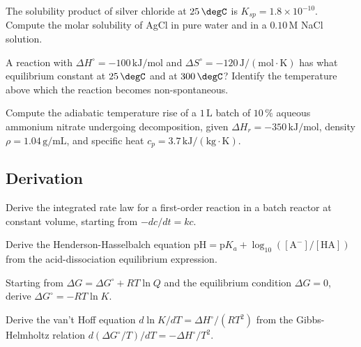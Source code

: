 \begin{exercise}
The solubility product of silver chloride at $25\,\degC$ is $K_{sp} =
1.8 \times 10^{-10}$. Compute the molar solubility of AgCl in pure
water and in a $0.10\,\text{M}$ NaCl solution.
\end{exercise}

\begin{exercise}
A reaction with $\Delta H^\circ = -100\,\text{kJ}/\text{mol}$ and
$\Delta S^\circ = -120\,\text{J}/(\text{mol}\cdot\si{\kelvin})$ has
what equilibrium constant at $25\,\degC$ and at $300\,\degC$? Identify
the temperature above which the reaction becomes non-spontaneous.
\end{exercise}

\begin{exercise}
Compute the adiabatic temperature rise of a $1\,\text{L}$ batch of
$10\,\%$ aqueous ammonium nitrate undergoing decomposition, given
$\Delta H_r = -350\,\text{kJ}/\text{mol}$, density $\rho = 1.04\,
\text{g}/\text{mL}$, and specific heat $c_p = 3.7\,\text{kJ}/
(\text{kg}\cdot\si{\kelvin})$.
\end{exercise}

\subsection*{Derivation}

\begin{exercise}
Derive the integrated rate law for a first-order reaction in a batch
reactor at constant volume, starting from $-dc/dt = k c$.
\end{exercise}

\begin{exercise}
Derive the Henderson-Hasselbalch equation $\text{pH} = \text{p}K_a +
\log_{10}([\text{A}^-]/[\text{HA}])$ from the acid-dissociation
equilibrium expression.
\end{exercise}

\begin{exercise}
Starting from $\Delta G = \Delta G^\circ + RT \ln Q$ and the
equilibrium condition $\Delta G = 0$, derive $\Delta G^\circ = -RT
\ln K$.
\end{exercise}

\begin{exercise}
Derive the van't Hoff equation $d \ln K/dT = \Delta H^\circ/(RT^2)$
from the Gibbs-Helmholtz relation $d(\Delta G^\circ/T)/dT = -\Delta
H^\circ/T^2$.
\end{exercise}

